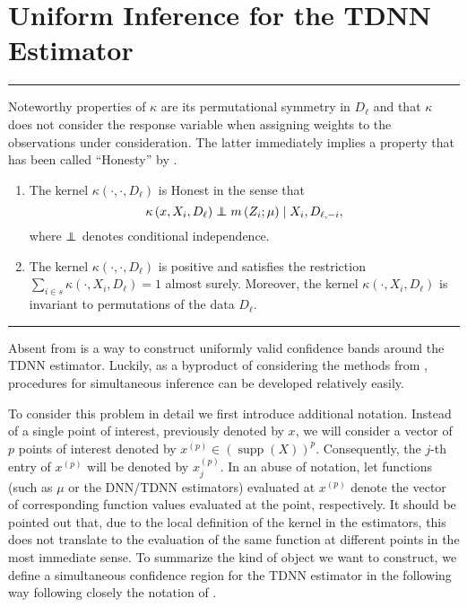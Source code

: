\section{Uniform Inference for the TDNN Estimator}\label{sec:unif_inf}
\hrule

Noteworthy properties of $\kappa$ are its permutational symmetry in $D_{\ell}$ and that $\kappa$ does not consider the response variable when assigning weights to the observations under consideration.
The latter immediately implies a property that has been called ``Honesty'' by \citet{wager_estimation_2018}.

\begin{boxD}
	\begin{dfn}\label{Symmetry_Honesty}\mbox{}
		\begin{enumerate}
			\item The kernel $\kappa\left(\cdot, \cdot, D_{\ell}\right)$ is Honest in the sense that
				  $$\kappa\left(x, X_{i}, D_{\ell}\right) \perp\!\!\!\!\perp m\left(Z_{i} ; \mu\right) \mid X_{i}, D_{\ell,-i},$$
				  where $\perp\!\!\!\!\perp$ denotes conditional independence.
			\item The kernel $\kappa\left(\cdot, \cdot, D_{\ell}\right)$ is positive and satisfies the restriction
				  $\sum_{i \in s} \kappa\left(\cdot, X_{i}, D_{\ell}\right)=1$ almost surely.
				  Moreover, the kernel $\kappa\left(\cdot, X_{i}, D_{\ell}\right)$ is invariant to permutations of the data $D_{\ell}.$
		\end{enumerate}
	\end{dfn}
\end{boxD}

\hrule
Absent from \citet{demirkaya_optimal_2024} is a way to construct uniformly valid confidence bands around the TDNN estimator.
Luckily, as a byproduct of considering the methods from \citet{ritzwoller_simultaneous_2024}, procedures for simultaneous inference can be developed relatively easily.

To consider this problem in detail we first introduce additional notation.
Instead of a single point of interest, previously denoted by $x$, we will consider a vector of $p$ points of interest denoted by $x^{(p)} \in \left(\operatorname{supp}\left(X\right)\right)^{p}$.
Consequently, the $j$-th entry of $x^{(p)}$ will be denoted by $x^{(p)}_{j}$.
In an abuse of notation, let functions (such as $\mu$ or the DNN/TDNN estimators) evaluated at $x^{(p)}$ denote the vector of corresponding function values evaluated at the point, respectively.
It should be pointed out that, due to the local definition of the kernel in the estimators, this does not translate to the evaluation of the same function at different points in the most immediate sense.
To summarize the kind of object we want to construct, we define a simultaneous confidence region for the TDNN estimator in the following way following closely the notation of \citet{ritzwoller_simultaneous_2024}.

